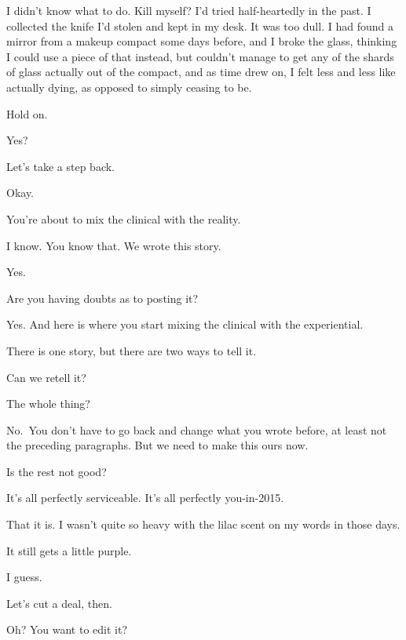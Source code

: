 \begin{paracol}{2}
\begin{leftcolumn}
I didn't know what to do. Kill myself? I'd tried half-heartedly in the past. I collected the knife I'd stolen and kept in my desk. It was too dull. I had found a mirror from a makeup compact some days before, and I broke the glass, thinking I could use a piece of that instead, but couldn't manage to get any of the shards of glass actually out of the compact, and as time drew on, I felt less and less like actually dying, as opposed to simply ceasing to be.
\newpage

\begin{ally}
Hold on.
\end{ally}
Yes?

\begin{ally}
Let's take a step back.
\end{ally}
Okay.

\begin{ally}
You're about to mix the clinical with the reality.
\end{ally}
I know. You know that. We wrote this story.

\begin{ally}
Yes.
\end{ally}
Are you having doubts as to posting it?

\begin{ally}
Yes. And here is where you start mixing the clinical with the experiential.
\end{ally}
There is one story, but there are two ways to tell it.

\begin{ally}
Can we retell it?
\end{ally}
The whole thing?

\begin{ally}
No.~You don't have to go back and change what you wrote before, at least not the preceding paragraphs. But we need to make this ours now.
\end{ally}
Is the rest not good?

\begin{ally}
It's all perfectly serviceable. It's all perfectly you-in-2015.
\end{ally}
That it is. I wasn't quite so heavy with the lilac scent on my words in those days.

\begin{ally}
It still gets a little purple.
\end{ally}
I guess.

\begin{ally}
Let's cut a deal, then.
\end{ally}
Oh? You want to edit it?


\end{leftcolumn}
\end{paracol}
